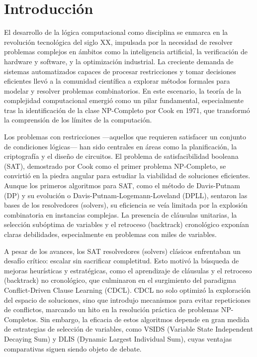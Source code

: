 \chapter*{Introducción}\label{chapter:introduction}
El desarrollo de la lógica computacional como disciplina se enmarca en la revolución tecnológica del siglo XX, impulsada por la necesidad de resolver problemas complejos en ámbitos como la inteligencia artificial, la verificación de hardware y software, y la optimización industrial. La creciente demanda de sistemas automatizados capaces de procesar restricciones y tomar decisiones eficientes llevó a la comunidad científica a explorar métodos formales para modelar y resolver problemas combinatorios. En este escenario, la teoría de la complejidad computacional emergió como un pilar fundamental, especialmente tras la identificación de la clase NP-Completo por Cook en 1971, que transformó la comprensión de los límites de la computación.

Los problemas con restricciones —aquellos que requieren satisfacer un conjunto de condiciones lógicas— han sido centrales en áreas como la planificación, la criptografía y el diseño de circuitos. El problema de satisfacibilidad booleana (SAT), demostrado por Cook como el primer problema NP-Completo, se convirtió en la piedra angular para estudiar la viabilidad de soluciones eficientes. Aunque los primeros algoritmos para SAT, como el método de Davis-Putnam (DP) y su evolución o Davis-Putnam-Logemann-Loveland (DPLL), sentaron las bases de los resolvedores (solvers), su eficiencia se veía limitada por la explosión combinatoria en instancias complejas. La presencia de cláusulas unitarias, la selección subóptima de variables y el retroceso (backtrack) cronológico exponían claras debilidades, especialmente en problemas con miles de variables.

A pesar de los avances, los SAT resolvedores (solvers) clásicos enfrentaban un desafío crítico: escalar sin sacrificar completitud. Esto motivó la búsqueda de mejoras heurísticas y estratégicas, como el aprendizaje de cláusulas y el retroceso (backtrack) no cronológico, que culminaron en el surgimiento del paradigma Conflict-Driven Clause Learning (CDCL). CDCL no solo optimizó la exploración del espacio de soluciones, sino que introdujo mecanismos para evitar repeticiones de conflictos, marcando un hito en la resolución práctica de problemas NP-Completos. Sin embargo, la eficacia de estos algoritmos depende en gran medida de estrategias de selección de variables, como VSIDS (Variable State Independent Decaying Sum) y DLIS (Dynamic Largest Individual Sum), cuyas ventajas comparativas siguen siendo objeto de debate.

